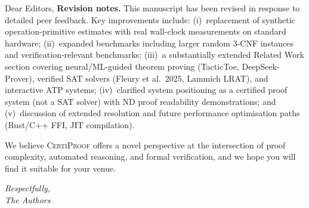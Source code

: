 \documentclass[11pt]{letter}
\newcommand{\CP}{\textsc{CertiProof}}
\begin{document}
\begin{letter}{Dear Editors,}
\textbf{Revision notes.}
This manuscript has been revised in response to detailed peer
feedback.  Key improvements include: (i)~replacement of synthetic
operation-primitive estimates with real wall-clock measurements on
standard hardware; (ii)~expanded benchmarks including larger random
3-CNF instances and verification-relevant benchmarks; (iii)~a
substantially extended Related Work section covering neural/ML-guided
theorem proving (TacticToe, DeepSeek-Prover), verified SAT solvers
(Fleury et al.\ 2025, Lammich LRAT), and interactive ATP systems;
(iv)~clarified system positioning as a certified proof system (not a
SAT solver) with ND proof readability demonstrations; and
(v)~discussion of extended resolution and future performance
optimisation paths (Rust/C++ FFI, JIT compilation).

We believe \CP{} offers a novel perspective at the intersection of
proof complexity, automated reasoning, and formal verification, and
we hope you will find it suitable for your venue.

\vspace{1cm}

\noindent\textit{Respectfully,}\\[6pt]
\textit{The Authors}

\end{letter}
\end{document}
